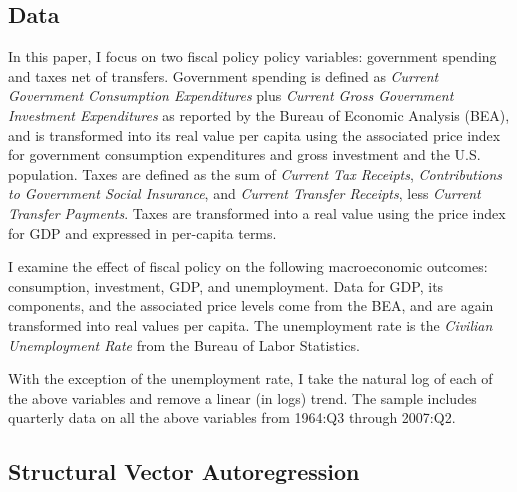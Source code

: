 \documentclass[12pt]{article}
\begin{document}
\subsection{Data}
In this paper, I focus on two fiscal policy policy variables: government spending and taxes net of transfers.  Government spending is defined as \textit{Current Government Consumption Expenditures} plus \textit{Current Gross Government Investment Expenditures} as reported by the Bureau of Economic Analysis (BEA), and is transformed into its real value per capita using the associated price index for government consumption expenditures and gross investment and the U.S. population.  Taxes are defined as the sum of \textit{Current Tax Receipts}, \textit{Contributions to Government Social Insurance}, and \textit{Current Transfer Receipts}, less \textit{Current Transfer Payments}.  Taxes are transformed into a real value using the price index for GDP and expressed in per-capita terms.

I examine the effect of fiscal policy on the following macroeconomic outcomes: consumption, investment, GDP, and unemployment.  Data for GDP, its components, and the associated price levels come from the BEA, and are again transformed into real values per capita.  The unemployment rate is the \textit{Civilian Unemployment Rate} from the Bureau of Labor Statistics. 

 With the exception of the unemployment rate, I take the natural log of each of the above variables and remove a linear (in logs) trend.  The sample includes quarterly data on all the above variables from 1964:Q3 through 2007:Q2.

\subsection{Structural Vector Autoregression}\label{s:svar1}
\end{document}
